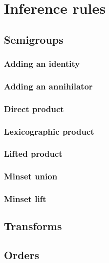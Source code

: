 \documentclass[10pt]{article}
\begin{document}
\section{Inference rules}
\label{sec:rules} 
 

\subsection{Semigroups} 
\label{sec:semigroups:rules} 
\subsubsection{Adding an identity} 
\label{sec:addid:rules} 
 
\subsubsection{Adding an annihilator} 
\label{sec:addann:rules} 
 
\subsubsection{Direct product} 
\label{sec:product:rules} 
 
\subsubsection{Lexicographic product} 
\label{sec:llex:rules} 
 
\subsubsection{Lifted product} 
\label{sec:lift:rules} 
 
\subsubsection{Minset union} 
\label{sec:minsetunion:rules} 
 
\subsubsection{Minset lift} 
\label{sec:minsetlift:rules} 
 

\subsection{Transforms} 
\label{sec:transforms:rules} 

\subsection{Orders} 
\label{sec:orders:rules} 
\end{document}
